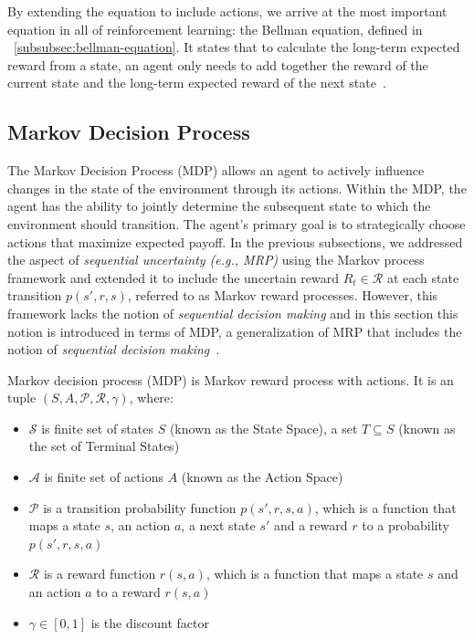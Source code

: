 \documentclass[../xlapes02]{subfiles}
\begin{document}
    By extending the equation to include actions, we arrive at the most important equation in all of reinforcement learning: the Bellman equation, defined in ~\cref{subsubsec:bellman-equation}. It states that to calculate the long-term expected reward from a state, an agent only needs to add together the reward of the current state and the long-term expected reward of the next state~\cite{FITMT25127}.

    \subsection{Markov Decision Process}\label{subsec:markov-decision-process}
    The Markov Decision Process (MDP) allows an agent to actively influence changes in the state of the environment through its actions. Within the MDP, the agent has the ability to jointly determine the subsequent state to which the environment should transition. The agent's primary goal is to strategically choose actions that maximize expected payoff. In the previous subsections, we addressed the aspect of \emph{sequential uncertainty (e.g., MRP)} using the Markov process framework and extended it to include the uncertain reward $R_t\in\mathcal{R}$ at each state transition $p(s',r,s)$, referred to as Markov reward processes. However, this framework lacks the notion of \emph{sequential decision making} and in this section this notion is introduced in terms of MDP, a generalization of MRP that includes the notion of \emph{sequential decision making}~\cite{rao2022foundations}.

    \begin{definition}
        Markov decision process (MDP) is Markov reward process with actions. It is an tuple $(S, A, \mathcal{P}, \mathcal{R}, \gamma)$, where:
        \begin{itemize}
            \item $\mathcal{S}$ is finite set of states $S$ (known as the State Space), a set $T \subseteq S$ (known as the set of Terminal States)
            \item $\mathcal{A}$ is finite set of actions $A$ (known as the Action Space)
            \item $\mathcal{P}$ is a transition probability function $p(s',r,s,a)$, which is a function that maps a state $s$, an action $a$, a next state $s'$ and a reward $r$ to a probability $p(s',r,s,a)$
            \item $\mathcal{R}$ is a reward function $r(s,a)$, which is a function that maps a state $s$ and an action $a$ to a reward $r(s,a)$
            \item $\gamma \in [0,1]$ is the discount factor
        \end{itemize}
    \end{definition}
\end{document}
